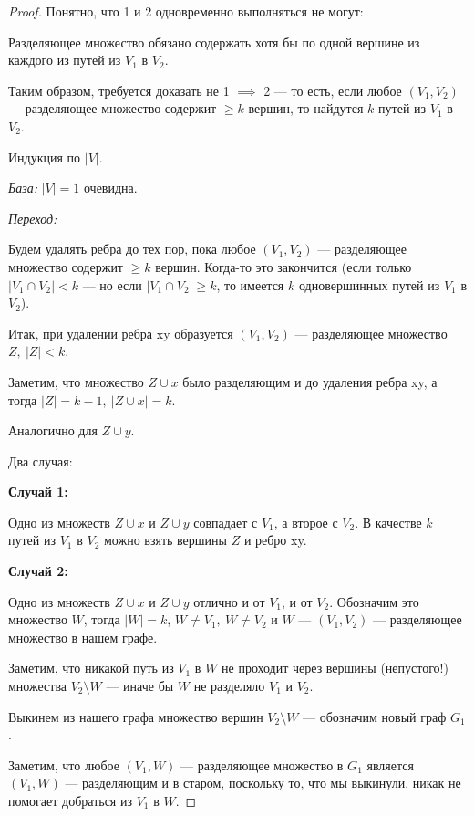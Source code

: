 \begin{proof}

    Понятно, что 1 и 2 одновременно выполняться не могут:

    Разделяющее множество обязано содержать хотя бы по одной вершине из каждого из путей из $V_1$ в $V_2$.

    Таким образом, требуется доказать не 1 $\implies$ 2 --- то есть, если любое $(V_1, V_2)$ --- разделяющее множество содержит $\geq k$ вершин, то найдутся $k$ путей из $V_1$ в $V_2$.

    Индукция по $|V|$.

    \textsl{База:} $|V| = 1$ очевидна.

    \textsl{Переход:}

    Будем удалять ребра до тех пор, пока любое $(V_1, V_2)$ --- разделяющее множество содержит $\geq k$ вершин. Когда-то это закончится (если только $|V_1 \cap V_2| < k$ --- но если $|V_1 \cap V_2| \geq k$, то имеется $k$ одновершинных путей из $V_1$ в $V_2$).

    Итак, при удалении ребра xy образуется $(V_1, V_2)$ --- разделяющее множество $Z,~|Z| < k$.

    Заметим, что множество $Z \cup x$ было разделяющим и до удаления ребра xy, а тогда $|Z| = k - 1,~|Z \cup x| = k$.

    Аналогично для $Z \cup y$.

    Два случая:

    \textbf{Случай 1:}

    Одно из множеств $Z \cup x$ и $Z \cup y$ совпадает с $V_1$, а второе с $V_2$. В качестве $k$ путей из $V_1$ в $V_2$ можно взять вершины $Z$ и ребро xy.

    \textbf{Случай 2:}

    Одно из множеств $Z \cup x$ и $Z \cup y$ отлично и от $V_1$, и от $V_2$. Обозначим это множество $W$, тогда $|W| = k$, $W \neq V_1,~W \neq V_2$ и $W$ --- $(V_1, V_2)$ --- разделяющее множество в нашем графе.

    Заметим, что никакой путь из $V_1$ в $W$ не проходит через вершины (непустого!) множества $V_2 \setminus W$ --- иначе бы $W$ не разделяло $V_1$ и $V_2$.
    
    Выкинем из нашего графа множество вершин $V_2 \setminus W$ --- обозначим новый граф $G_1$.

    Заметим, что любое $(V_1, W)$ --- разделяющее множество в $G_1$ является $(V_1, W)$ --- разделяющим и в старом, поскольку то, что мы выкинули, никак не помогает добраться из $V_1$ в $W$.
    

\end{proof}
